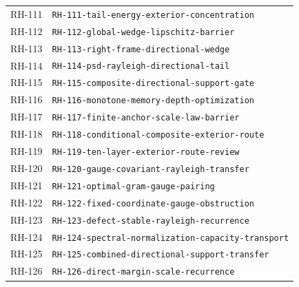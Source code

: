 \begin{longtable}{r >{\raggedright\arraybackslash}p{}}
RH-111 & \texttt{RH-\allowbreak{}111-\allowbreak{}tail-\allowbreak{}energy-\allowbreak{}exterior-\allowbreak{}concentration}\\
RH-112 & \texttt{RH-\allowbreak{}112-\allowbreak{}global-\allowbreak{}wedge-\allowbreak{}lipschitz-\allowbreak{}barrier}\\
RH-113 & \texttt{RH-\allowbreak{}113-\allowbreak{}right-\allowbreak{}frame-\allowbreak{}directional-\allowbreak{}wedge}\\
RH-114 & \texttt{RH-\allowbreak{}114-\allowbreak{}psd-\allowbreak{}rayleigh-\allowbreak{}directional-\allowbreak{}tail}\\
RH-115 & \texttt{RH-\allowbreak{}115-\allowbreak{}composite-\allowbreak{}directional-\allowbreak{}support-\allowbreak{}gate}\\
RH-116 & \texttt{RH-\allowbreak{}116-\allowbreak{}monotone-\allowbreak{}memory-\allowbreak{}depth-\allowbreak{}optimization}\\
RH-117 & \texttt{RH-\allowbreak{}117-\allowbreak{}finite-\allowbreak{}anchor-\allowbreak{}scale-\allowbreak{}law-\allowbreak{}barrier}\\
RH-118 & \texttt{RH-\allowbreak{}118-\allowbreak{}conditional-\allowbreak{}composite-\allowbreak{}exterior-\allowbreak{}route}\\
RH-119 & \texttt{RH-\allowbreak{}119-\allowbreak{}ten-\allowbreak{}layer-\allowbreak{}exterior-\allowbreak{}route-\allowbreak{}review}\\
RH-120 & \texttt{RH-\allowbreak{}120-\allowbreak{}gauge-\allowbreak{}covariant-\allowbreak{}rayleigh-\allowbreak{}transfer}\\
RH-121 & \texttt{RH-\allowbreak{}121-\allowbreak{}optimal-\allowbreak{}gram-\allowbreak{}gauge-\allowbreak{}pairing}\\
RH-122 & \texttt{RH-\allowbreak{}122-\allowbreak{}fixed-\allowbreak{}coordinate-\allowbreak{}gauge-\allowbreak{}obstruction}\\
RH-123 & \texttt{RH-\allowbreak{}123-\allowbreak{}defect-\allowbreak{}stable-\allowbreak{}rayleigh-\allowbreak{}recurrence}\\
RH-124 & \texttt{RH-\allowbreak{}124-\allowbreak{}spectral-\allowbreak{}normalization-\allowbreak{}capacity-\allowbreak{}transport}\\
RH-125 & \texttt{RH-\allowbreak{}125-\allowbreak{}combined-\allowbreak{}directional-\allowbreak{}support-\allowbreak{}transfer}\\
RH-126 & \texttt{RH-\allowbreak{}126-\allowbreak{}direct-\allowbreak{}margin-\allowbreak{}scale-\allowbreak{}recurrence}\\

\end{longtable}
